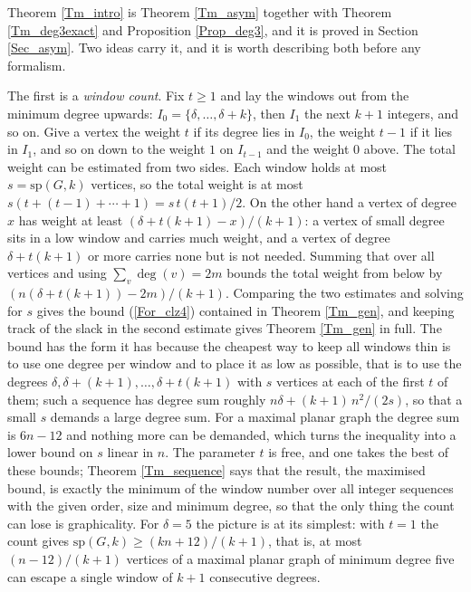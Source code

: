 \documentclass[10pt,a4paper]{article}
\begin{document}
Theorem \ref{Tm_intro} is Theorem \ref{Tm_asym} together with Theorem \ref{Tm_deg3exact} and
Proposition \ref{Prop_deg3}, and it is proved in Section \ref{Sec_asym}. Two ideas carry it, and it is
worth describing both before any formalism.

The first is a \emph{window count}. Fix $t\geq 1$ and lay the windows out from the minimum degree
upwards: $I_{0}=\{\delta ,\ldots ,\delta +k\}$, then $I_{1}$ the next $k+1$ integers, and so on. Give a
vertex the weight $t$ if its degree lies in $I_{0}$, the weight $t-1$ if it lies in $I_{1}$, and so on
down to the weight $1$ on $I_{t-1}$ and the weight $0$ above. The total weight can be estimated from two
sides. Each window holds at most $s=\mathrm{sp}(G,k)$ vertices, so the total weight is at most
$s\left( t+(t-1)+\cdots +1\right) =s\,t(t+1)/2$. On the other hand a vertex of degree $x$ has weight at
least $\left( \delta +t(k+1)-x\right) /(k+1)$: a vertex of small degree sits in a low window and carries
much weight, and a vertex of degree $\delta +t(k+1)$ or more carries none but is not needed. Summing that
over all vertices and using $\sum_{v}\deg (v)=2m$ bounds the total weight from below by
$\left( n(\delta +t(k+1))-2m\right) /(k+1)$. Comparing the two estimates and solving for $s$ gives the
bound (\ref{For_clz4}) contained in Theorem \ref{Tm_gen}, and keeping track of the slack in the second
estimate gives Theorem \ref{Tm_gen} in full. The bound has the form it has because the cheapest way to keep all windows thin is to use
one degree per window and to place it as low as possible, that is to use the degrees $\delta ,\delta
+(k+1),\ldots ,\delta +t(k+1)$ with $s$ vertices at each of the first $t$ of them; such a sequence has
degree sum roughly $n\delta +(k+1)\,n^{2}/(2s)$, so that a small $s$ demands a large degree sum. For a
maximal planar graph the degree sum is $6n-12$ and nothing more can be demanded, which turns the inequality
into a lower bound on $s$ linear in $n$. The parameter $t$ is free, and one takes the best of these
bounds; Theorem \ref{Tm_sequence} says that the result, the maximised bound, is exactly the minimum of
the window number over all integer sequences with the given order, size and minimum degree, so that the
only thing the count can lose is graphicality. For $\delta =5$ the picture is at its simplest: with
$t=1$ the count gives $\mathrm{sp}(G,k)\geq (kn+12)/(k+1)$, that is, at most $(n-12)/(k+1)$ vertices of
a maximal planar graph of minimum degree five can escape a single window of $k+1$ consecutive degrees.
\end{document}
